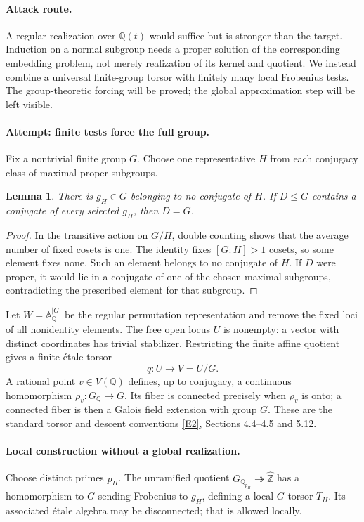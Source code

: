 \documentclass[11pt,a4paper]{article}
\newcommand{\Z}{\mathbb{Z}}
\newcommand{\Q}{\mathbb{Q}}
\newcommand{\A}{\mathbb{A}}
\newcommand{\eref}[2]{\hyperlink{extra:#1:#2}{[E#2]}}
\newtheorem{notebooklemma}{Lemma}[section]
\numberwithin{equation}{section}
\begin{document}
\paragraph{Attack route.}
A regular realization over $\Q(t)$ would suffice but is stronger than the target. Induction on a normal subgroup needs a proper solution of the corresponding embedding problem, not merely realization of its kernel and quotient. We instead combine a universal finite-group torsor with finitely many local Frobenius tests. The group-theoretic forcing will be proved; the global approximation step will be left visible.

\paragraph{Attempt: finite tests force the full group.}
Fix a nontrivial finite group $G$. Choose one representative $H$ from each conjugacy class of maximal proper subgroups.
\begin{notebooklemma}\label{r61:derangement}
There is $g_H\in G$ belonging to no conjugate of $H$. If $D\le G$ contains a conjugate of every selected $g_H$, then $D=G$.
\end{notebooklemma}
\begin{proof}
In the transitive action on $G/H$, double counting shows that the average number of fixed cosets is one. The identity fixes $[G:H]>1$ cosets, so some element fixes none. Such an element belongs to no conjugate of $H$. If $D$ were proper, it would lie in a conjugate of one of the chosen maximal subgroups, contradicting the prescribed element for that subgroup.
\end{proof}

Let $W=\A^{|G|}_{\Q}$ be the regular permutation representation and remove the fixed loci of all nonidentity elements. The free open locus $U$ is nonempty: a vector with distinct coordinates has trivial stabilizer. Restricting the finite affine quotient gives a finite étale torsor
\[
 q:U\longrightarrow V=U/G.
\]
A rational point $v\in V(\Q)$ defines, up to conjugacy, a continuous homomorphism $\rho_v:G_{\Q}\to G$. Its fiber is connected precisely when $\rho_v$ is onto; a connected fiber is then a Galois field extension with group $G$. These are the standard torsor and descent conventions \eref{61}{2}, Sections 4.4--4.5 and 5.12.

\paragraph{Local construction without a global realization.}
Choose distinct primes $p_H$. The unramified quotient $G_{\Q_{p_H}}\twoheadrightarrow\widehat{\Z}$ has a homomorphism to $G$ sending Frobenius to $g_H$, defining a local $G$-torsor $T_H$. Its associated étale algebra may be disconnected; that is allowed locally.
\end{document}
